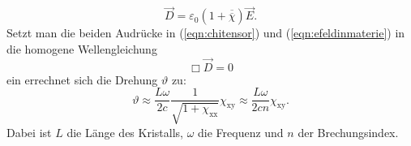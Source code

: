 \begin{equation}
  \label{eqn:efeldinmaterie}
  \vec{D}=\varepsilon_0\left(1+\overline{\overline{\chi}}\right)\vec{E}.
\end{equation}
Setzt man die beiden Audrücke in (\ref{eqn:chitensor}) und (\ref{eqn:efeldinmaterie}) in die homogene Wellengleichung
\begin{equation*}
  \Box \vec{D} = 0
\end{equation*}
ein errechnet sich die Drehung $\vartheta$ \cite[3-5]{Anleitung} zu:
\begin{equation}
  \label{eqn:drehungmitchi}
  \vartheta \approx \frac{L\omega}{2c} \frac{1}{\sqrt{1+\chi_\mathrm{xx}}} \chi_\mathrm{xy}\approx \frac{L\omega}{2cn} \chi_\mathrm{xy}.
\end{equation}
Dabei ist $L$ die Länge des Kristalls, $\omega$ die Frequenz und $n$ der Brechungsindex.
